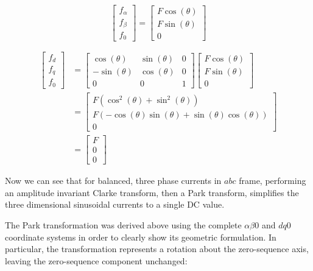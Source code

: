 \documentclass{article}
\begin{document}
\begin{equation}
    \begin{bmatrix}
        f_\alpha \\
        f_\beta \\
        f_0
    \end{bmatrix}
    =
    \begin{bmatrix}
        F\cos(\theta) \\
        F\sin(\theta) \\
        0
    \end{bmatrix}
\end{equation}

\begin{align}
    \begin{bmatrix}
        f_d \\
        f_q \\
        f_0
    \end{bmatrix}
    &=
    \begin{bmatrix}
        \cos(\theta) & \sin(\theta) & 0 \\
        -\sin(\theta) & \cos(\theta) & 0 \\
        0 & 0 & 1
    \end{bmatrix}
    \begin{bmatrix}
        F\cos(\theta) \\
        F\sin(\theta) \\
        0
    \end{bmatrix} \\[8pt]
    &=
    \begin{bmatrix}
        F(\cos^2(\theta) + \sin^2(\theta)) \\
        F(-\cos(\theta)\sin(\theta) + \sin(\theta)\cos(\theta)) \\
        0
    \end{bmatrix} \\[8pt]
    &=
    \begin{bmatrix}
        F \\
        0 \\
        0
    \end{bmatrix}
\end{align}

Now we can see that for balanced, three phase currents in $abc$ frame, performing an amplitude invariant Clarke transform, then a Park transform, simplifies the three dimensional sinusoidal currents to a single DC value.

The Park transformation was derived above using the complete $\alpha\beta0$ and $dq0$ coordinate systems in order to clearly show its geometric formulation. In particular, the transformation represents a rotation about the zero-sequence axis, leaving the zero-sequence component unchanged:
\end{document}
